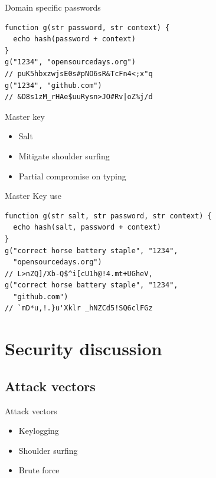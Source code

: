 \documentclass{beamer}
\begin{document}
\begin{frame}[fragile]{Domain specific passwords}
  \begin{block}{}
    \begin{verbatim}
function g(str password, str context) {
  echo hash(password + context)
}
g("1234", "opensourcedays.org")
// puK5hbxzwjsE0s#pNO6sR&TcFn4<;x"q
g("1234", "github.com")
// &D8s1zM_rHAe$uuRysn>JO#Rv|oZ%j/d
    \end{verbatim}
  \end{block}
\end{frame}

\begin{frame}[fragile]{Master key}
  \begin{itemize}
    \item Salt
    \item Mitigate shoulder surfing
    \item Partial compromise on typing
  \end{itemize}
\end{frame}

\begin{frame}[fragile]{Master Key use}
  \begin{block}{}
    \begin{verbatim}
function g(str salt, str password, str context) {
  echo hash(salt, password + context)
}
g("correct horse battery staple", "1234",
  "opensourcedays.org")
// L>nZQ]/Xb-Q$^i[cU1h@!4.mt+UGheV,
g("correct horse battery staple", "1234",
  "github.com")
// `mD*u,!.}u'Xklr _hNZCd5!SQ6clFGz
    \end{verbatim}
  \end{block}
\end{frame}

\section{Security discussion}
\subsection{Attack vectors}
\begin{frame}{Attack vectors}
  \begin{itemize}
    \item Keylogging
    \item Shoulder surfing
    \item Brute force
  \end{itemize}
\end{frame}
\end{document}
